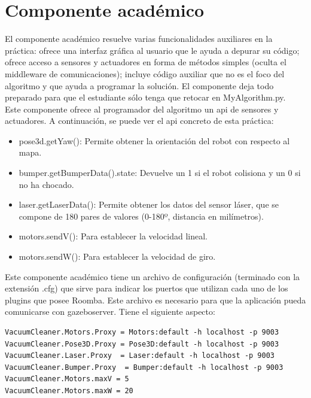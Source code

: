 \section{Componente académico}
El componente académico resuelve varias funcionalidades auxiliares en la práctica: ofrece una interfaz gráfica al usuario que le ayuda a depurar su código; ofrece acceso a sensores y actuadores en forma de métodos simples (oculta el middleware de comunicaciones); incluye código auxiliar que no es el foco del algoritmo y que ayuda a programar la solución. El componente deja todo preparado para que el estudiante sólo tenga que retocar en MyAlgorithm.py.\\

Este componente ofrece al programador del algoritmo un \acrshort{api} de sensores y actuadores. A continuación, se puede ver el \acrshort{api} concreto de esta práctica:

\begin{itemize}
\item pose3d.getYaw(): Permite obtener la orientación del robot con respecto al mapa.
\item bumper.getBumperData().state: Devuelve un 1 si el robot colisiona y un 0 si no ha chocado.
\item laser.getLaserData(): Permite obtener los datos del sensor láser, que se compone de 180 pares de valores (0-180º, distancia en milímetros).
\item motors.sendV(): Para establecer la velocidad lineal.
\item motors.sendW(): Para establecer la velocidad de giro.

\end{itemize}


Este componente académico tiene un archivo de configuración (terminado con la extensión .cfg) que sirve para indicar los puertos que utilizan cada uno de los plugins que posee Roomba. Este archivo es necesario para que la aplicación pueda comunicarse con gazeboserver. Tiene el siguiente aspecto: 


\vspace{20pt}
	\begin{lstlisting}[frame=single]
VacuumCleaner.Motors.Proxy = Motors:default -h localhost -p 9003
VacuumCleaner.Pose3D.Proxy = Pose3D:default -h localhost -p 9003
VacuumCleaner.Laser.Proxy  = Laser:default -h localhost -p 9003
VacuumCleaner.Bumper.Proxy  = Bumper:default -h localhost -p 9003
VacuumCleaner.Motors.maxV = 5
VacuumCleaner.Motors.maxW = 20

	\end{lstlisting}
	
